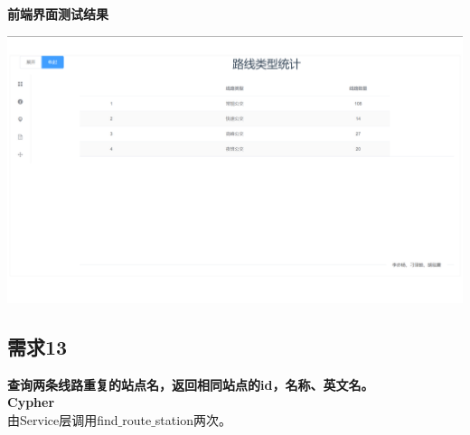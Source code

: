 \documentclass[11pt,a4paper]{article}
\begin{document}
\textbf{前端界面测试结果} \\
\begin{center}
\centering
\includegraphics[scale=0.3]{./assets/demand12.png} 
\end{center}

\subsection{需求13}
\textbf{查询两条线路重复的站点名，返回相同站点的id，名称、英文名。} \\
\textbf{Cypher} \\
由Service层调用find$\_$route$\_$station两次。
\end{document}
